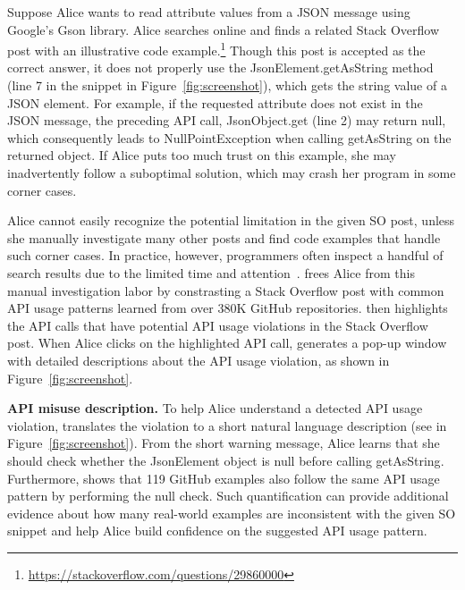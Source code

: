 Suppose Alice wants to read attribute values from a {\ttt JSON} message using Google's Gson library. Alice searches online and finds a related Stack Overflow post with an illustrative code example.\footnote{\url{https://stackoverflow.com/questions/29860000}} Though this post is accepted as the correct answer, it does not properly use the {\ttt JsonElement.getAsString} method (line 7 in the snippet in Figure~\ref{fig:screenshot}), which gets the {\ttt string} value of a {\ttt JSON} element. For example, if the requested attribute does not exist in the {\ttt JSON} message, the preceding API call, {\ttt JsonObject.get} (line 2) may return {\ttt null}, which consequently leads to {\ttt NullPointException} when calling {\ttt getAsString} on the returned object. If Alice puts too much trust on this example, she may inadvertently follow a suboptimal solution, which may crash her program in some corner cases. 

Alice cannot easily recognize the potential limitation in the given SO post, unless she manually investigate many other posts and find code examples that handle such corner cases. In practice, however, programmers often inspect a handful of search results due to the limited time and attention~\cite{brandt2009two, starke2009working}. {\tool} frees Alice from this manual investigation labor by constrasting a Stack Overflow post with common API usage patterns learned from over 380K GitHub repositories. {\tool} then highlights the API calls that have potential API usage violations in the Stack Overflow post. When Alice clicks on the highlighted API call, {\tool} generates a pop-up window with detailed descriptions about the API usage violation, as shown in Figure~\ref{fig:screenshot}.

{\bf API misuse description.} To help Alice understand a detected API usage violation, {\tool} translates the violation to a short natural language description (see  in Figure~\ref{fig:screenshot}). From the short warning message, Alice learns that she should check whether the {\ttt JsonElement} object is {\ttt null} before calling {\ttt getAsString}. Furthermore, {\tool} shows that 119 GitHub examples also follow the same API usage pattern by performing the {\ttt null} check. Such quantification can provide additional evidence about how many real-world examples are inconsistent with the given SO snippet and help Alice build confidence on the suggested API usage pattern.

